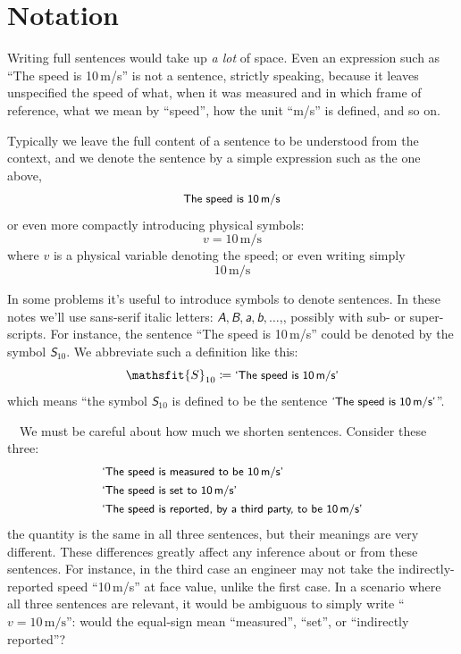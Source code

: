\documentclass[
  a4paper,
  DIV=11,
  numbers=noendperiod,
  oneside]{scrreprt}
\begin{document}
\hypertarget{notation}{%
\section{Notation}\label{notation}}

Writing full sentences would take up \emph{a lot} of space. Even an
expression such as ``{The speed is 10\,m/s}'' is not a sentence,
strictly speaking, because it leaves unspecified the speed of what, when
it was measured and in which frame of reference, what we mean by
``speed'', how the unit ``m/s'' is defined, and so on.

Typically we leave the full content of a sentence to be understood from
the context, and we denote the sentence by a simple expression such as
the one above, \[
\textsf{\small The speed is 10\,m/s}
\] or even more compactly introducing physical symbols: \[
v = 10\,\mathrm{m/s}
\] where \(v\) is a physical variable denoting the speed; or even
writing simply \[
10\,\mathrm{m/s}
\]

In some problems it's useful to introduce symbols to denote sentences.
In these notes we'll use sans-serif italic letters:
{\(\mathsfit{A},\mathsfit{B},\mathsfit{a},\mathsfit{b},\dotsc\),},
possibly with sub- or super-scripts. For instance, the sentence ``{The
speed is 10\,m/s}'' could be denoted by the symbol
\(\mathsfit{S}_{10}\). We abbreviate such a definition like this: \[
\mathsfit{S}_{10} \coloneqq \textsf{\small`The speed is 10\,m/s'}
\] which means ``the symbol \(\mathsfit{S}_{10}\) is defined to be the
sentence {\(\textsf{\small`The speed is 10\,m/s'}\)''.}

~~We must be careful about how much we
shorten sentences. Consider these three: \[
\begin{aligned}
&\textsf{\small`The speed is measured to be 10\,m/s'}
\\
&\textsf{\small`The speed is set to 10\,m/s'}
\\
&\textsf{\small`The speed is reported, by a third party, to be 10\,m/s'}
\end{aligned}
\] the quantity is the same in all three sentences, but their meanings
are very different. These differences greatly affect any inference about
or from these sentences. For instance, in the third case an engineer may
not take the indirectly-reported speed ``10\,m/s'' at face value, unlike
the first case. In a scenario where all three sentences are relevant, it
would be ambiguous to simply write {``\(v = 10\,\mathrm{m/s}\)''}: would
the equal-sign mean ``measured'', ``set'', or ``indirectly reported''?
\end{document}
